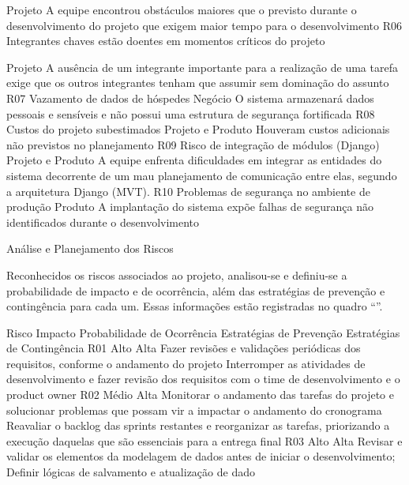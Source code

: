 Projeto
	A equipe encontrou obstáculos maiores que o previsto durante o desenvolvimento do projeto que exigem maior tempo para o desenvolvimento
	R06
	Integrantes chaves estão doentes em momentos críticos do projeto
	

Projeto
	A ausência de um integrante importante para a realização de uma tarefa exige que os outros integrantes tenham que assumir sem dominação do assunto 
	R07
	Vazamento de dados de hóspedes
	Negócio
	O sistema  armazenará dados pessoais e sensíveis e não possui uma estrutura de segurança fortificada
	R08
	Custos do projeto subestimados
	Projeto e Produto
	Houveram custos adicionais não previstos no planejamento
	R09
	Risco de integração de módulos (Django)
	Projeto e Produto
	A equipe enfrenta dificuldades em integrar as entidades do sistema decorrente de um mau planejamento de comunicação entre elas, segundo a arquitetura Django (MVT).
	R10
	Problemas de segurança no ambiente de produção
	Produto
	A implantação do sistema expõe falhas de segurança não identificados durante o desenvolvimento
	


Análise e Planejamento dos Riscos


        Reconhecidos os riscos associados ao projeto, analisou-se e definiu-se a probabilidade de impacto e de ocorrência, além das estratégias de prevenção e contingência para cada um. Essas informações estão registradas no quadro “”.






Risco
	Impacto
	Probabilidade de Ocorrência
	Estratégias de Prevenção
	Estratégias de Contingência
	R01
	Alto
	Alta
	Fazer revisões e validações periódicas dos requisitos, conforme o andamento do projeto
	Interromper as atividades de desenvolvimento e fazer revisão dos requisitos com o time de desenvolvimento e o product owner
	R02
	Médio
	Alta
	Monitorar o andamento das tarefas do projeto e solucionar problemas que possam vir a impactar o andamento do cronograma
	Reavaliar o backlog das sprints restantes e reorganizar as tarefas, priorizando a execução daquelas que são essenciais para a entrega final
	R03
	Alto
	Alta
	Revisar e validar os elementos da modelagem de dados antes de iniciar o desenvolvimento; Definir lógicas de salvamento e atualização de dado


